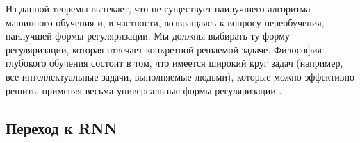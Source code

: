 Из данной теоремы вытекает, что не существует наилучшего 
алгоритма машинного обучения и, в частности, возвращаясь к вопросу переобучения, 
наилучшей формы регуляризации. 
Мы должны выбирать ту форму регуляризации, которая отвечает конкретной
решаемой задаче. Философия глубокого обучения
состоит в том, что имеется широкий круг задач (например, все интеллектуальные задачи, 
выполняемые людьми), которые можно эффективно решить, применяя весьма
универсальные формы регуляризации \cite{Goodfellow-et-al-2016}.

\subsection{Переход к RNN}



